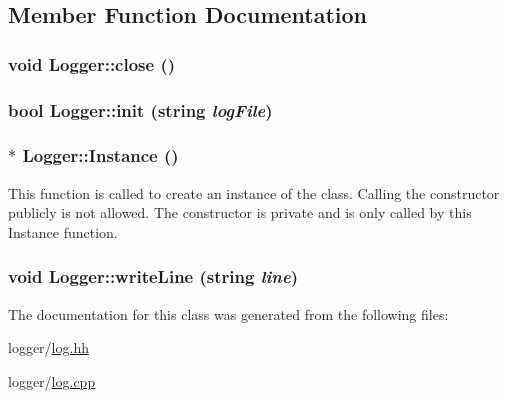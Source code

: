 \subsection{Member Function Documentation}
\hypertarget{classLogger_afee2bab560c2db0190c980884d33868c}{
\subsubsection[{close}]{\setlength{\rightskip}{0pt plus 5cm}void Logger::close ()}}
\label{classLogger_afee2bab560c2db0190c980884d33868c}
\hypertarget{classLogger_af843738beb6818dedd7156a720141e98}{
\subsubsection[{init}]{\setlength{\rightskip}{0pt plus 5cm}bool Logger::init (string {\em logFile})}}
\label{classLogger_af843738beb6818dedd7156a720141e98}
\hypertarget{classLogger_afae0bf19389387a916656073572cb846}{
\subsubsection[{Instance}]{ $\ast$ Logger::Instance ()}}
\label{classLogger_afae0bf19389387a916656073572cb846}
This function is called to create an instance of the class. Calling the constructor publicly is not allowed. The constructor is private and is only called by this Instance function. \hypertarget{classLogger_aa958f35a7eeb31a8ea4fff0c0574e029}{
\subsubsection[{writeLine}]{\setlength{\rightskip}{0pt plus 5cm}void Logger::writeLine (string {\em line})}}
\label{classLogger_aa958f35a7eeb31a8ea4fff0c0574e029}


The documentation for this class was generated from the following files:\begin{DoxyCompactItemize}
\item 
logger/\hyperlink{log_8hh}{log.hh}\item 
logger/\hyperlink{log_8cpp}{log.cpp}\end{DoxyCompactItemize}
